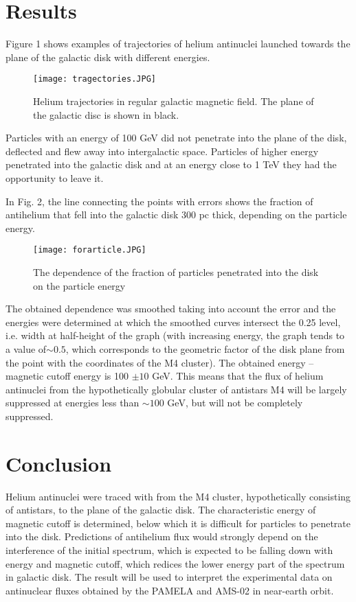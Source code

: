\documentclass{article}
\begin{document}
\section{Results}
Figure 1 shows examples of trajectories of helium antinuclei launched towards the plane of the galactic disk with different energies.
\begin{figure}[htp]
\centering
\texttt{[image: tragectories.JPG]}\\
\caption {Helium trajectories in regular galactic magnetic field. The plane of the galactic disc is shown in black.}
\label{monoline}
\end{figure}
Particles with an energy of 100 GeV did not penetrate into the plane of the disk, deflected and flew away into intergalactic space. Particles of higher energy penetrated into the galactic disk and at an energy close to 1 TeV they had the opportunity to leave it.

In Fig. 2, the line connecting the points with errors shows the fraction of antihelium that fell into the galactic disk 300 pc thick, depending on the particle energy.
\begin{figure}
\centering
\texttt{[image: forarticle.JPG]}\\
\caption{The dependence of the fraction of particles penetrated into the disk on the particle energy}
\label{monoline}
\end{figure}

The obtained dependence was smoothed taking into account the error and the energies were determined at which the smoothed curves intersect the 0.25 level, i.e. width at half-height of the graph (with increasing energy, the graph tends to a value of$ \sim 0.5$, which corresponds to the geometric factor of the disk plane from the point with the coordinates of the M4 cluster). The obtained energy -- magnetic cutoff energy is 100 $\pm 10$ GeV. This means that the flux of helium antinuclei from the hypothetically globular cluster of antistars M4 will be largely suppressed at energies less than $ \sim 100$ GeV, but will not be completely suppressed.
\section{Conclusion}
Helium antinuclei were traced with \cite{Golubkov} from the M4 cluster, hypothetically consisting of antistars, to the plane of the galactic disk. The characteristic energy of magnetic cutoff is determined, below which it is difficult for particles to penetrate into the disk. Predictions of antihelium flux would strongly depend on the interference of the initial spectrum, which is expected to be falling down with energy and magnetic cutoff, which redices the lower energy part of the spectrum in galactic disk. The result will be used to interpret the experimental data on antinuclear fluxes obtained by the PAMELA and AMS-02 in near-earth orbit.
\end{document}
